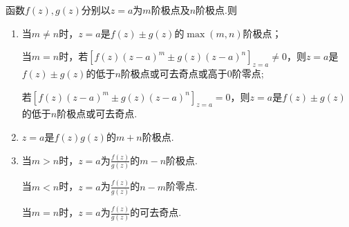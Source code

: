 \documentclass[../../main.tex]{subfiles}%
\begin{document}
\begin{proposition}\label{proposition:函数和积商的极点}
函数$f(z),g(z)$分别以$z=a$为$m$阶极点及$n$阶极点.则
\begin{enumerate}[(1)]
\item 当$m\neq n$时，$z=a$是$f(z)\pm g(z)$的$\max(m,n)$阶极点；

当$m=n$时，若$\left[ f(z)\left( z-a \right) ^m\pm g(z)\left( z-a \right) ^n \right] _{z=a}\neq0$，则$z=a$是$f(z)\pm g(z)$的低于$n$阶极点或可去奇点或高于$0$阶零点;

若$\left[ f(z)\left( z-a \right) ^m\pm g(z)\left( z-a \right) ^n \right] _{z=a}=0$，则$z=a$是$f(z)\pm g(z)$的低于$n$阶极点或可去奇点.

\item $z=a$是$f(z)g(z)$的$m+n$阶极点.

\item 当$m>n$时，$z=a$为$\frac{f(z)}{g(z)}$的$m-n$阶极点.

当$m<n$时，$z=a$为$\frac{f(z)}{g(z)}$的$n-m$阶零点.

当$m=n$时，$z=a$为$\frac{f(z)}{g(z)}$的可去奇点.
\end{enumerate}
\end{proposition}
\end{document}
